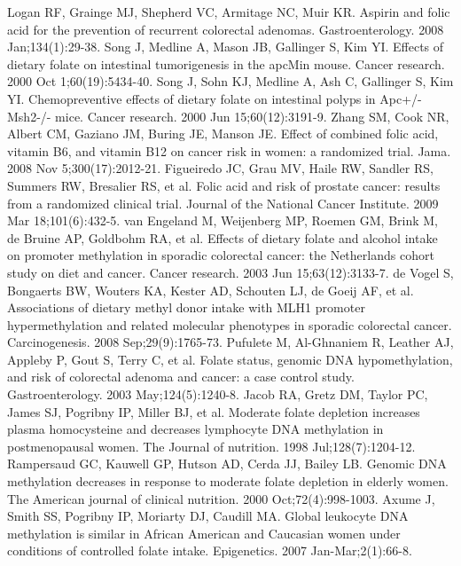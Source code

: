 \begin{thebibliography}{12}
		Logan RF, Grainge MJ, Shepherd VC, Armitage NC, Muir KR. Aspirin and folic acid for the prevention of recurrent colorectal adenomas. Gastroenterology. 2008 Jan;134(1):29-38. 
		Song J, Medline A, Mason JB, Gallinger S, Kim YI. Effects of dietary folate on intestinal tumorigenesis in the apcMin mouse. Cancer research. 2000 Oct 1;60(19):5434-40. 
		Song J, Sohn KJ, Medline A, Ash C, Gallinger S, Kim YI. Chemopreventive effects of dietary folate on intestinal polyps in Apc+/-Msh2-/- mice. Cancer research. 2000 Jun 15;60(12):3191-9. 
		Zhang SM, Cook NR, Albert CM, Gaziano JM, Buring JE, Manson JE. Effect of combined folic acid, vitamin B6, and vitamin B12 on cancer risk in women: a randomized trial. Jama. 2008 Nov 5;300(17):2012-21. 
		Figueiredo JC, Grau MV, Haile RW, Sandler RS, Summers RW, Bresalier RS, et al. Folic acid and risk of prostate cancer: results from a randomized clinical trial. Journal of the National Cancer Institute. 2009 Mar 18;101(6):432-5. 
		van Engeland M, Weijenberg MP, Roemen GM, Brink M, de Bruine AP, Goldbohm RA, et al. Effects of dietary folate and alcohol intake on promoter methylation in sporadic colorectal cancer: the Netherlands cohort study on diet and cancer. Cancer research. 2003 Jun 15;63(12):3133-7. 
		de Vogel S, Bongaerts BW, Wouters KA, Kester AD, Schouten LJ, de Goeij AF, et al. Associations of dietary methyl donor intake with MLH1 promoter hypermethylation and related molecular phenotypes in sporadic colorectal cancer. Carcinogenesis. 2008 Sep;29(9):1765-73. 
		Pufulete M, Al-Ghnaniem R, Leather AJ, Appleby P, Gout S, Terry C, et al. Folate status, genomic DNA hypomethylation, and risk of colorectal adenoma and cancer: a case control study. Gastroenterology. 2003 May;124(5):1240-8. 
		Jacob RA, Gretz DM, Taylor PC, James SJ, Pogribny IP, Miller BJ, et al. Moderate folate depletion increases plasma homocysteine and decreases lymphocyte DNA methylation in postmenopausal women. The Journal of nutrition. 1998 Jul;128(7):1204-12. 
		Rampersaud GC, Kauwell GP, Hutson AD, Cerda JJ, Bailey LB. Genomic DNA methylation decreases in response to moderate folate depletion in elderly women. The American journal of clinical nutrition. 2000 Oct;72(4):998-1003. 
		Axume J, Smith SS, Pogribny IP, Moriarty DJ, Caudill MA. Global leukocyte DNA methylation is similar in African American and Caucasian women under conditions of controlled folate intake. Epigenetics. 2007 Jan-Mar;2(1):66-8. 

\end{thebibliography}

